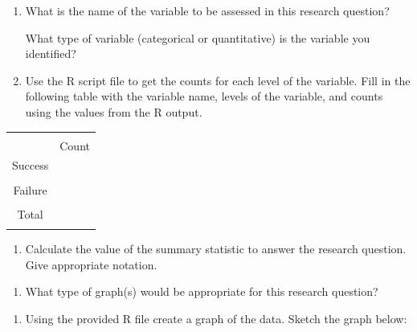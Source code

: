 \documentclass[
]{report}
\providecommand{\tightlist}{%
  \setlength{\itemsep}{0pt}\setlength{\parskip}{0pt}}
\begin{document}
\begin{enumerate}
\def\labelenumi{\alph{enumi}.}
\item
  What is the name of the variable to be assessed in this research question?
  \vspace{0.5in}

  What type of variable (categorical or quantitative) is the variable you identified?
  \vspace{0.3in}
\item
  Use the R script file to get the counts for each level of the variable. Fill in the following table with the variable name, levels of the variable, and counts using the values from the R output.
\end{enumerate}

\begingroup
\setlength{\tabcolsep}{14pt}
\renewcommand{\arraystretch}{2}
\begin{center}
\begin{tabular}{|c|p{1in}|}
\hline
 &  \\
 & Count \\ \hline
 Success & \\
 & \\ \hline
 Failure & \\
 & \\ \hline
 Total & \\
 & \\ \hline
\end{tabular}
\end{center}
\endgroup

\begin{enumerate}
\def\labelenumi{\alph{enumi}.}
\setcounter{enumi}{2}
\tightlist
\item
  Calculate the value of the summary statistic to answer the research question. Give appropriate notation.
\end{enumerate}

\vspace{0.5in}

\begin{enumerate}
\def\labelenumi{\alph{enumi}.}
\setcounter{enumi}{3}
\tightlist
\item
  What type of graph(s) would be appropriate for this research question?
\end{enumerate}

\vspace{0.3in}

\begin{enumerate}
\def\labelenumi{\alph{enumi}.}
\setcounter{enumi}{4}
\tightlist
\item
  Using the provided R file create a graph of the data. Sketch the graph below:
\end{enumerate}
\end{document}
